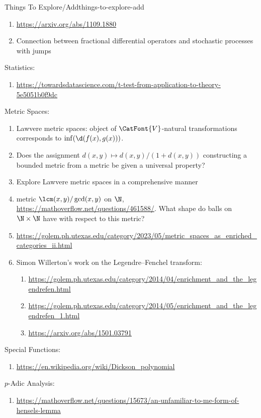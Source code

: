 \begin{remark}{Things To Explore/Add}{things-to-explore-add}
\begin{enumerate}
        \item \url{https://arxiv.org/abs/1109.1880}
        \item Connection between fractional differential operators and stochastic processes with jumps
    \end{enumerate}
    Statistics:
    \begin{enumerate}
        \item \url{https://towardsdatascience.com/t-test-from-application-to-theory-5e5051b0f9dc}
    \end{enumerate}
    Metric Spaces:
    \begin{enumerate}
        \item Lawvere metric spaces: object of $\CatFont{V}$-natural transformations corresponds to $\inf(\d(f(x),g(x)))$.
        \item Does the assignment $d(x,y)\mapsto d(x,y)/(1+d(x,y))$ constructing a bounded metric from a metric be given a universal property?
        \item Explore Lawvere metric spaces in a comprehensive manner
        \item metric $\lcm(x,y)/\gcd(x,y)$ on $\N$, \url{https://mathoverflow.net/questions/461588/}. What shape do balls on $\N\times\N$ have with respect to this metric?
        \item \url{https://golem.ph.utexas.edu/category/2023/05/metric_spaces_as_enriched_categories_ii.html}
        \item Simon Willerton's work on the Legendre--Fenchel transform:
            \begin{enumerate}
                \item \url{https://golem.ph.utexas.edu/category/2014/04/enrichment_and_the_legendrefen.html}
                \item \url{https://golem.ph.utexas.edu/category/2014/05/enrichment_and_the_legendrefen_1.html}
                \item \url{https://arxiv.org/abs/1501.03791}
            \end{enumerate}
    \end{enumerate}
    Special Functions:
    \begin{enumerate}
        \item \url{https://en.wikipedia.org/wiki/Dickson_polynomial}
    \end{enumerate}
    $p$-Adic Analysis:
    \begin{enumerate}
        \item \url{https://mathoverflow.net/questions/15673/an-unfamiliar-to-me-form-of-hensels-lemma}

\end{enumerate}
\end{remark}
